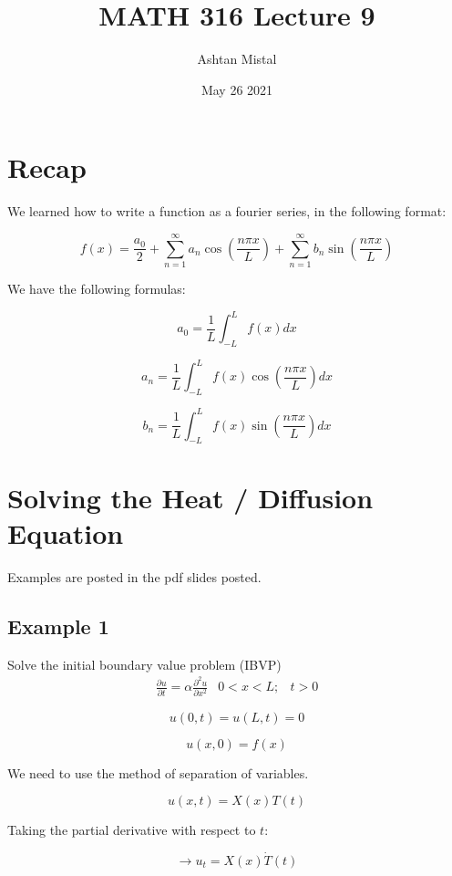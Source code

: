 \documentclass{article}
\title{MATH 316 Lecture 9}
\author{Ashtan Mistal}
\date{May 26 2021}
\begin{document}
\ifstandalone
\maketitle
\fi

\graphicspath{{./Lecture09/}}

\section{Recap}

We learned how to write a function as a fourier series, in the following format:

$$f(x) = \frac{a_0}{2} + \sum_{n = 1}^\infty a_n \cos( \frac{n \pi x}{L}) + \sum_{n = 1}^\infty b_n \sin(\frac{n \pi x}{L})$$

We have the following formulas:

$$a_0 = \frac{1}{L} \int_{-L}^L f(x) dx$$

$$a_n = \frac{1}{L} \int_{-L}^L f(x) \cos(\frac{n \pi x}{L}) dx$$

$$b_n = \frac{1}{L} \int_{-L}^L f(x) \sin(\frac{n \pi x}{L}) dx$$

\section{Solving the Heat / Diffusion Equation}

Examples are posted in the pdf slides posted. 

\subsection{Example 1}

Solve the initial boundary value problem (IBVP)
\begin{equation}
\label{Heat Equation}
    \begin{matrix} \frac{\partial u}{\partial t} = \alpha \frac{\partial^2 u}{\partial x^2} & 0 < x < L; & t > 0 \end{matrix}
\end{equation}


$$u(0,t) = u(L,t) = 0$$

$$u(x,0) = f(x)$$

We need to use the method of separation of variables. 

$$u(x,t) = X(x) T(t)$$

Taking the partial derivative with respect to $t$:

$$\rightarrow u_t = X(x) \dot{T} (t)$$
\end{document}

